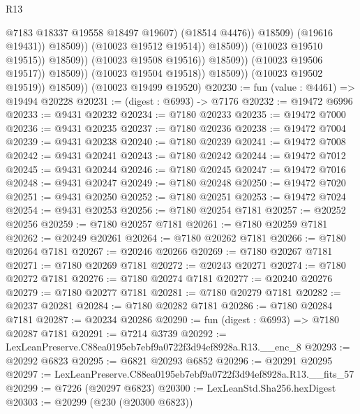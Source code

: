 \begin{lexlean}{R13}
\begin{coremodule}
                                                    @7183
                                                    @18337
                                                    @19558
                                                    @18497
                                                    @19607)
                                                  (@18514 @4476))
                                                @18509)
                                              (@19616 @19431))
                                            @18509))
                                        (@10023 @19512 @19514))
                                      @18509))
                                  (@10023 @19510 @19515))
                                @18509))
                            (@10023 @19508 @19516))
                          @18509))
                      (@10023 @19506 @19517))
                    @18509))
                (@10023 @19504 @19518))
              @18509))
          (@10023 @19502 @19519))
        @18509))
    (@10023 @19499 @19520)
@20230 := fun (value : @4461) => @19494 @20228
@20231 := (digest : @6993) -> @7176
@20232 := @19472 @6996
@20233 := @9431 @20232
@20234 := @7180 @20233
@20235 := @19472 @7000
@20236 := @9431 @20235
@20237 := @7180 @20236
@20238 := @19472 @7004
@20239 := @9431 @20238
@20240 := @7180 @20239
@20241 := @19472 @7008
@20242 := @9431 @20241
@20243 := @7180 @20242
@20244 := @19472 @7012
@20245 := @9431 @20244
@20246 := @7180 @20245
@20247 := @19472 @7016
@20248 := @9431 @20247
@20249 := @7180 @20248
@20250 := @19472 @7020
@20251 := @9431 @20250
@20252 := @7180 @20251
@20253 := @19472 @7024
@20254 := @9431 @20253
@20256 := @7180 @20254 @7181
@20257 := @20252 @20256
@20259 := @7180 @20257 @7181
@20261 := @7180 @20259 @7181
@20262 := @20249 @20261
@20264 := @7180 @20262 @7181
@20266 := @7180 @20264 @7181
@20267 := @20246 @20266
@20269 := @7180 @20267 @7181
@20271 := @7180 @20269 @7181
@20272 := @20243 @20271
@20274 := @7180 @20272 @7181
@20276 := @7180 @20274 @7181
@20277 := @20240 @20276
@20279 := @7180 @20277 @7181
@20281 := @7180 @20279 @7181
@20282 := @20237 @20281
@20284 := @7180 @20282 @7181
@20286 := @7180 @20284 @7181
@20287 := @20234 @20286
@20290 := fun (digest : @6993) => @7180 @20287 @7181
@20291 := @7214 @3739
@20292 := LexLeanPreserve.C88ea0195eb7ebf9a0722f3d94ef8928a.R13.__enc_8
@20293 := @20292 @6823
@20295 := @6821 @20293 @6852
@20296 := @20291 @20295
@20297 := LexLeanPreserve.C88ea0195eb7ebf9a0722f3d94ef8928a.R13.__fits_57
@20299 := @7226 (@20297 @6823)
@20300 := LexLeanStd.Sha256.hexDigest
@20303 := @20299 (@230 (@20300 @6823))

\end{coremodule}
\end{lexlean}
